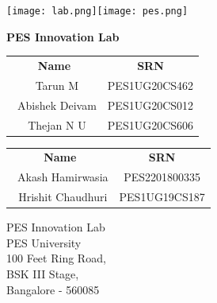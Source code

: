\documentclass[12pt]{report}
\begin{document}
 

\begin{titlepage}
\texttt{[image: lab.png]}\hfill \texttt{[image: pes.png]}

\begin{center}
\vspace*{1cm}

\textbf{\Large{PES Innovation Lab}}

\vspace{0.3cm}
\vspace{0.1cm}
       
       
\vspace{0.8cm}
            
\vspace{0.8cm}
       
\vspace{0.2cm}
       
\begin{tabular}{c c}    
    \textbf{Name} & 
    \textbf{SRN} \\[0.5cm]
    \ {Tarun M} & {PES1UG20CS462} \\
    \ {Abishek Deivam} & {PES1UG20CS012} \\
    \ {Thejan N U} & {PES1UG20CS606} \\         
\end{tabular}
\vspace{0.5cm}

\vspace{0.2cm}
       
\begin{tabular}{c c}
    \textbf{Name} & 
    \textbf{SRN} \\[0.5cm]
    \ {Akash Hamirwasia} & {PES2201800335} \\
    \ {Hrishit Chaudhuri} & {PES1UG19CS187} \\
\end{tabular}
       
\vfill
\vspace{0.5cm}
            
PES Innovation Lab\\
PES University\\
100 Feet Ring Road,\\
BSK III Stage,\\
Bangalore - 560085
            
\end{center}
\end{titlepage}
\end{document}
